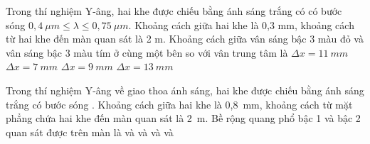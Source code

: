 \begin{vidu}%
Trong thí nghiệm Y-âng, hai khe được chiếu bằng ánh sáng trắng có có bước sóng $0,4\  \mu m\leq\lambda \leq 0,75\ \mu m$. Khoảng cách giữa hai khe là 0,3 mm, khoảng cách từ hai khe đến màn quan sát là 2 m. Khoảng cách giữa vân sáng bậc 3 màu đỏ và vân sáng bậc 3 màu tím ở cùng một bên so với vân trung tâm là
\choice
{$\Delta x=11\ mm$}
{\True $\Delta x=7\ mm$}
{$\Delta x=9\ mm$}
{$\Delta x=13\ mm$}
\end{vidu} 
\begin{vidu}%
Trong thí nghiệm Y-âng về giao thoa ánh sáng, hai khe được chiếu bằng ánh sáng trắng có bước sóng . Khoảng cách giữa hai khe là 0,8\ mm, khoảng cách từ mặt phẳng chứa hai khe đến màn quan sát là 2\ m. Bề rộng quang phổ bậc 1 và bậc 2 quan sát được trên màn là
\choice
{ và }
{\True {} và }
{ và }
{ và }
\end{vidu} 

